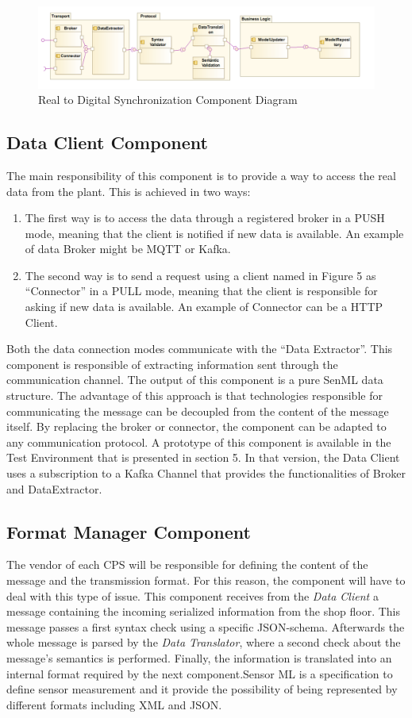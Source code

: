 \begin{figure}
  \includegraphics[width=\linewidth]{images/diagramComponent.PNG}
  \caption{Real to Digital Synchronization Component Diagram}
  \label{fig:realToDigitalComponentDia}
\end{figure}

\subsection{Data Client Component}
The main responsibility of this component is to provide a way to access the real data from the plant. This is achieved in two ways:
\begin{enumerate}
\item The first way is to access the data through a registered broker in a PUSH mode, meaning that the client is notified if new data is available. An example of data Broker might be MQTT or Kafka.
\item The second way is to send a request using a client named in Figure 5 as “Connector” in a PULL mode, meaning that the client is responsible for asking if new data is available. An example of Connector can be a HTTP Client.
\end{enumerate}
Both the data connection modes communicate with the “Data Extractor”. This component is responsible of extracting information sent through the communication channel. The output of this component is a pure SenML data structure. The advantage of this approach is that technologies responsible for communicating the message can be decoupled from the content of the message itself. By replacing the broker or connector, the component can be adapted to any communication protocol. 
A prototype of this component is available in the Test Environment that is presented in section  5. In that version, the Data Client uses a subscription to a Kafka Channel that provides the functionalities of Broker and DataExtractor.

\subsection{Format Manager Component}
The vendor of each CPS will be responsible for defining the content of the message and the transmission format. For this reason, the component will have to deal with this type of issue.
This component receives from the \textit{Data Client} a message containing the incoming serialized information from the shop floor. This message passes a first syntax check using a specific JSON-schema. Afterwards the whole message is parsed by the \textit{Data Translator}, where a second check about the message’s semantics is performed. Finally, the information is translated into an internal format required by the next component.Sensor ML is a specification to define sensor measurement and it provide the possibility of being represented by different formats including XML and JSON.

